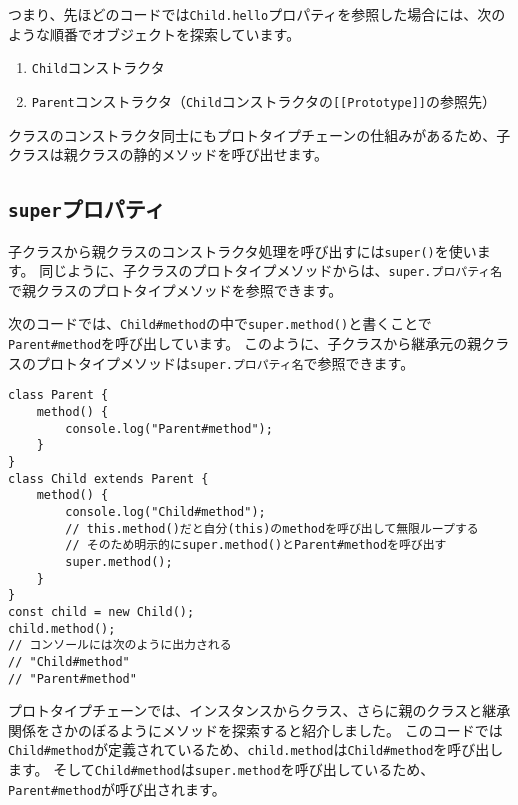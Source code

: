 つまり、先ほどのコードでは\texttt{Child.hello}プロパティを参照した場合には、次のような順番でオブジェクトを探索しています。

\begin{enumerate}
\def\labelenumi{\arabic{enumi}.}
\item
  \texttt{Child}コンストラクタ
\item
  \texttt{Parent}コンストラクタ（\texttt{Child}コンストラクタの\texttt{[[Prototype]]}の参照先）
\end{enumerate}

クラスのコンストラクタ同士にもプロトタイプチェーンの仕組みがあるため、子クラスは親クラスの静的メソッドを呼び出せます。

\hypertarget{super-property}{%
\subsection{\texorpdfstring{\texttt{super}プロパティ}{superプロパティ}}\label{super-property}}

子クラスから親クラスのコンストラクタ処理を呼び出すには\texttt{super()}を使います。
同じように、子クラスのプロトタイプメソッドからは、\texttt{super.\hbox{}プロパティ名}で親クラスのプロトタイプメソッドを参照できます。

次のコードでは、\texttt{Child\#method}の中で\texttt{super.method()}と書くことで\texttt{Parent\#method}を呼び出しています。
このように、子クラスから継承元の親クラスのプロトタイプメソッドは\texttt{super.\hbox{}プロパティ名}で参照できます。

\begin{lstlisting}
class Parent {
    method() {
        console.log("Parent#method");
    }
}
class Child extends Parent {
    method() {
        console.log("Child#method");
        // this.method()だと自分(this)のmethodを呼び出して無限ループする
        // そのため明示的にsuper.method()とParent#methodを呼び出す
        super.method();
    }
}
const child = new Child();
child.method(); 
// コンソールには次のように出力される
// "Child#method"
// "Parent#method"
\end{lstlisting}

プロトタイプチェーンでは、インスタンスからクラス、さらに親のクラスと継承関係をさかのぼるようにメソッドを探索すると紹介しました。
このコードでは\texttt{Child\#method}が定義されているため、\texttt{child.method}は\texttt{Child\#method}を呼び出します。
そして\texttt{Child\#method}は\texttt{super.method}を呼び出しているため、\texttt{Parent\#method}が呼び出されます。

